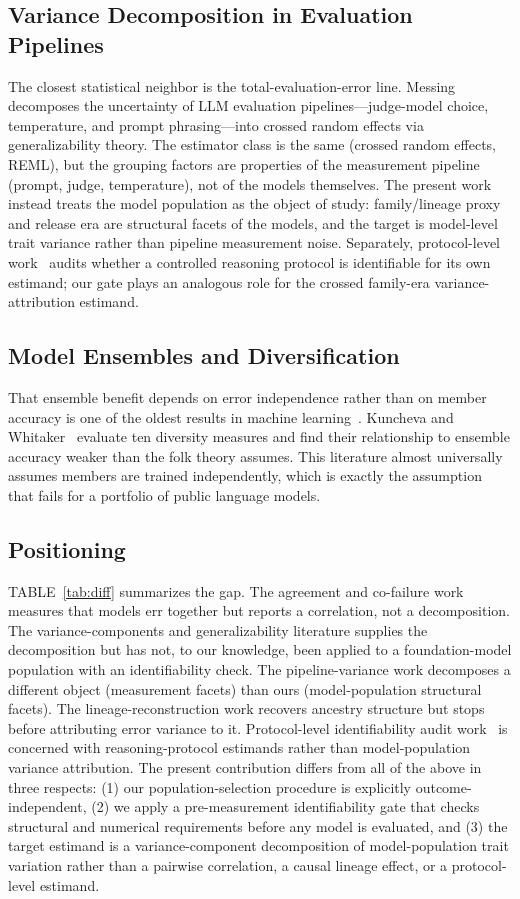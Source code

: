 \documentclass{ieeeaccess}
\theoremstyle{definition}
\theoremstyle{plain}
\begin{document}
\subsection{Variance Decomposition in Evaluation Pipelines}
The closest statistical neighbor is the total-evaluation-error line. Messing~\cite{messing2026} decomposes the uncertainty of LLM evaluation pipelines---judge-model choice, temperature, and prompt phrasing---into crossed random effects via generalizability theory. The estimator class is the same (crossed random effects, REML), but the grouping factors are properties of the measurement pipeline (prompt, judge, temperature), not of the models themselves. The present work instead treats the model population as the object of study: family/lineage proxy and release era are structural facets of the models, and the target is model-level trait variance rather than pipeline measurement noise. Separately, protocol-level work~\cite{identaudit2026} audits whether a controlled reasoning protocol is identifiable for its own estimand; our gate plays an analogous role for the crossed family-era variance-attribution estimand.

\subsection{Model Ensembles and Diversification}
That ensemble benefit depends on error independence rather than on member accuracy is one of the oldest results in machine learning~\cite{dietterich2000,wolpert1992,breiman2001}. Kuncheva and Whitaker~\cite{kuncheva2003} evaluate ten diversity measures and find their relationship to ensemble accuracy weaker than the folk theory assumes. This literature almost universally assumes members are trained independently, which is exactly the assumption that fails for a portfolio of public language models.

\subsection{Positioning}
TABLE~\ref{tab:diff} summarizes the gap. The agreement and co-failure work measures that models err together but reports a correlation, not a decomposition. The variance-components and generalizability literature supplies the decomposition but has not, to our knowledge, been applied to a foundation-model population with an identifiability check. The pipeline-variance work decomposes a different object (measurement facets) than ours (model-population structural facets). The lineage-reconstruction work recovers ancestry structure but stops before attributing error variance to it. Protocol-level identifiability audit work~\cite{identaudit2026} is concerned with reasoning-protocol estimands rather than model-population variance attribution. The present contribution differs from all of the above in three respects: (1) our population-selection procedure is explicitly outcome-independent, (2) we apply a pre-measurement identifiability gate that checks structural and numerical requirements before any model is evaluated, and (3) the target estimand is a variance-component decomposition of model-population trait variation rather than a pairwise correlation, a causal lineage effect, or a protocol-level estimand.
\end{document}
